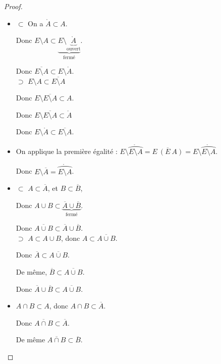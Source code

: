 \begin{proof}~\\
    \begin{itemize}
        \item $\subset$
        On a $\mathring A \subset A$. 

        Donc $E \setminus A \subset \underbrace{E \setminus \underbrace{\mathring A}_{\text{ouvert}}}_{\text{fermé}}$.

        Donc $\overline{E \setminus A} \subset E \setminus \mathring A$. \\

        $\supset$ $E \setminus A \subset \overline{E \setminus A}$

        Donc $E \setminus \overline{E \setminus A} \subset A$.

        Donc $E \setminus \overline{E \setminus A} \subset \mathring A$ 

        Donc $E \setminus \mathring A \subset \overline{E \setminus A}$. 

        \item On applique la première égalité :
        $E \setminus \mathring{\overparen{E \setminus A}} = \overline{E \ (E \ A)} = E \setminus \mathring{\overparen{E \setminus A}}$.

        Donc $E \setminus \overline A = \mathring{\overparen{E \setminus A}}$.

        \item $\subset$ $A \subset \overline A$, et $B \subset \overline B$,

        Donc $A \cup B \subset \underbrace{\overline A \cup \overline B}_{\text{fermé}}$.

        Donc $\overline{A \cup B} \subset \overline A \cup \overline B$. \\

        $\supset$ $A \subset A \cup B$, donc $A \subset \overline{A \cup B}$.

        Donc $\overline A \subset \overline{A \cup B}$.

        De même, $\overline B \subset \overline{A \cup B}$.

        Donc $\overline A \cup \overline B \subset \overline{A \cup B}$.

        \item 
        $A \cap B \subset A$, donc $A \cap B \subset \overline A$. 

        Donc $\overline {A \cap B} \subset \overline A$.

        De même $\overline {A \cap B} \subset \overline B$.


\end{itemize}
\end{proof}
